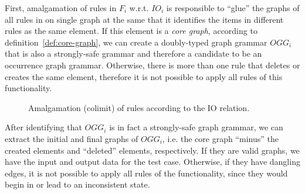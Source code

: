 First, amalgamation of rules in $F_i$ w.r.t. $IO_i$ is responsible to ``glue'' the graphs of all rules in on single graph at the same that it identifies the items in different rules as the same element. If this element is a \emph{core graph}, according to definition~\ref{def:core-graph}, we can create a doubly-typed graph grammar $OGG_i$ that is also a strongly-safe grammar and therefore a candidate to be an occurrence graph grammar. Otherwise, there is more than one rule that deletes or creates
the same element, therefore it is not possible to apply all rules of this functionality.

\begin{figure}[!ht]
  \centering
  \caption{Amalgamation (colimit) of rules according to the IO relation.}\label{fig:tests:colimit}
\end{figure}

\begin{example}\label{ex:amalgamation}
\end{example}

After identifying that $OGG_i$ is in fact a strongly-safe graph grammar, we can extract the initial and final graphs of $OGG_i$, i.e. the core graph ``minus'' the created elements and ``deleted'' elements, respectively. If they are valid graphs, we have the input and output data for the test case. Otherwise, if they have dangling edges, it is not possible to apply all rules of the functionality, since they would begin in or lead to an inconsistent state.

\begin{example}
\end{example}

